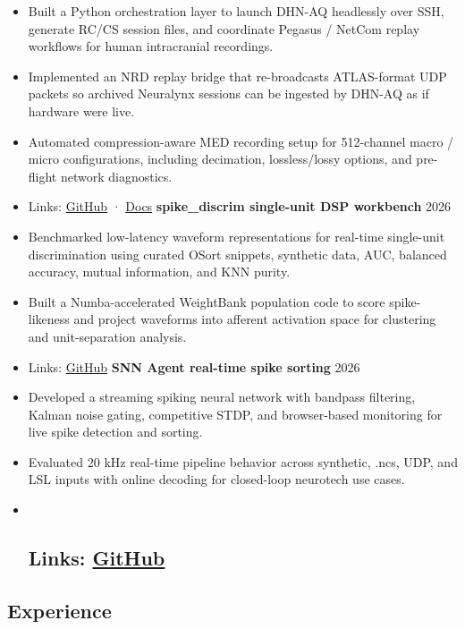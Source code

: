 \documentclass[11pt]{article}
\begin{document}
\begin{itemize}
\item
  Built a Python orchestration layer to launch DHN-AQ headlessly over
  SSH, generate RC/CS session files, and coordinate Pegasus / NetCom
  replay workflows for human intracranial recordings.
\item
  Implemented an NRD replay bridge that re-broadcasts ATLAS-format UDP
  packets so archived Neuralynx sessions can be ingested by DHN-AQ as if
  hardware were live.
\item
  Automated compression-aware MED recording setup for 512-channel macro
  / micro configurations, including decimation, lossless/lossy options,
  and pre-flight network diagnostics.
\item
  Links:
  \href{https://github.com/BarkBarkBarkBarkBarkBarkBark/dhn_client}{GitHub}
  ·
  \href{https://barkbarkbarkbarkbarkbarkbark.github.io/dhn_client/}{Docs}
  \textbf{spike\_discrim single-unit DSP workbench} \textbar{} 2026
\item
  Benchmarked low-latency waveform representations for real-time
  single-unit discrimination using curated OSort snippets, synthetic
  data, AUC, balanced accuracy, mutual information, and KNN purity.
\item
  Built a Numba-accelerated WeightBank population code to score
  spike-likeness and project waveforms into afferent activation space
  for clustering and unit-separation analysis.
\item
  Links:
  \href{https://github.com/BarkBarkBarkBarkBarkBarkBark/spike_discrim}{GitHub}
  \textbf{SNN Agent real-time spike sorting} \textbar{} 2026
\item
  Developed a streaming spiking neural network with bandpass filtering,
  Kalman noise gating, competitive STDP, and browser-based monitoring
  for live spike detection and sorting.
\item
  Evaluated 20 kHz real-time pipeline behavior across synthetic, .ncs,
  UDP, and LSL inputs with online decoding for closed-loop neurotech use
  cases.
\item ~
  \subsection{\texorpdfstring{Links:
  \href{https://github.com/BarkBarkBarkBarkBarkBarkBark/SNNeuro}{GitHub}}{Links: GitHub}}\label{links-github}
\end{itemize}

\subsection{Experience}\label{experience}
\end{document}
